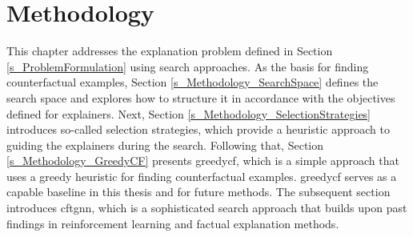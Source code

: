 \section{Methodology}
\label{s_Methodology}

This chapter addresses the explanation problem defined in Section \ref{s_ProblemFormulation} using search approaches. As the basis for finding counterfactual examples, Section \ref{s_Methodology_SearchSpace} defines the search space and explores how to structure it in accordance with the objectives defined for explainers. Next, Section \ref{s_Methodology_SelectionStrategies} introduces so-called selection strategies, which provide a heuristic approach to guiding the explainers during the search. Following that, Section \ref{s_Methodology_GreedyCF} presents \gls{greedycf}, which is a simple approach that uses a greedy heuristic for finding counterfactual examples. \gls{greedycf} serves as a capable baseline in this thesis and for future methods. The subsequent section introduces \gls{cftgnn}, which is a sophisticated search approach that builds upon past findings in reinforcement learning and factual explanation methods.




